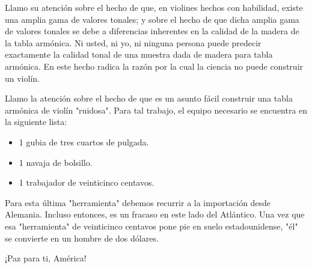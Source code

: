 \documentclass[12pt]{book}
\begin{document}
Llamo su atención sobre el hecho de que, en violines hechos con habilidad, existe una amplia gama de valores tonales; y sobre el hecho de que dicha amplia gama de valores tonales se debe a diferencias inherentes en la calidad de la madera de la tabla armónica. Ni usted, ni yo, ni ninguna persona puede predecir exactamente la calidad tonal de una muestra dada de madera para tabla armónica. En este hecho radica la razón por la cual la ciencia no puede construir un violín.

Llamo la atención sobre el hecho de que es un asunto fácil construir una tabla armónica de violín "ruidosa". Para tal trabajo, el equipo necesario se encuentra en la siguiente lista:

\begin{itemize}
    \item 1 gubia de tres cuartos de pulgada.
    \item 1 navaja de bolsillo.
    \item 1 trabajador de veinticinco centavos.
\end{itemize}

Para esta última "herramienta" debemos recurrir a la importación desde Alemania. Incluso entonces, es un fracaso en este lado del Atlántico. Una vez que esa "herramienta" de veinticinco centavos pone pie en suelo estadounidense, "él" se convierte en un hombre de dos dólares.

¡Paz para ti, América!
\end{document}
